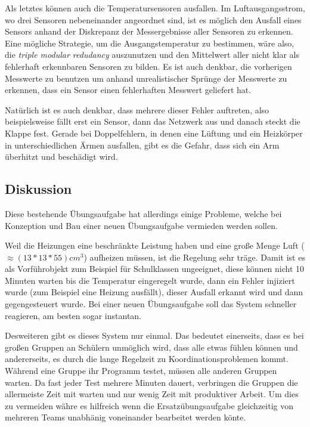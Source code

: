Als letztes k{\"{o}}nnen auch die Temperatursensoren ausfallen. Im Luftausgangsstrom, wo drei Sensoren 
nebeneinander angeordnet sind, ist es m{\"{o}}glich den
Ausfall eines Sensors anhand der Diskrepanz der Messergebnisse aller Sensoren zu erkennen. Eine m{\"{o}}gliche 
Strategie, um die Ausgangstemperatur zu
bestimmen, w{\"{a}}re also, die \textit{triple modular redudancy} auszunutzen und den Mittelwert aller nicht klar als 
fehlerhaft erkennbaren Sensoren zu bilden.
Es ist auch denkbar, die vorherigen Messwerte zu benutzen um anhand unrealistischer Spr{\"{u}}nge der Messwerte zu 
erkennen, dass ein Sensor einen fehlerhaften Messwert geliefert hat.

Nat{\"{u}}rlich ist es auch denkbar, dass mehrere dieser Fehler auftreten, also beispielsweise f{\"{a}}llt
erst ein Sensor, dann das Netzwerk aus und danach steckt die Klappe fest.
Gerade bei Doppelfehlern, in denen eine L{\"{u}}ftung und ein Heizk{\"{o}}rper in unterschiedlichen {\"{A}}rmen 
ausfallen, gibt es die Gefahr, dass sich ein Arm {\"{u}}berhitzt und besch{\"{a}}digt wird.

\subsection{Diskussion}
Diese bestehende {\"{U}}bungsaufgabe hat allerdings einige Probleme, welche bei Konzeption und Bau einer neuen
{\"{U}}bungsaufgabe vermieden werden sollen.

Weil die Heizungen eine beschr{\"{a}}nkte Leistung haben und eine gro{\ss}e Menge Luft 
($ \approx (13*13*55)cm^3$) aufheizen m{\"{u}}ssen, ist die Regelung sehr tr{\"{a}}ge. Damit ist es als
Vorf{\"{u}}hrobjekt zum Beispiel f{\"{u}}r Schulklassen ungeeignet, diese k{\"{o}}nnen nicht 10 Minuten warten
bis die Temperatur eingeregelt wurde, dann ein Fehler injiziert wurde (zum Beispiel eine Heizung
ausf{\"{a}}llt), dieser Ausfall erkannt wird und dann gegengesteuert wurde. Bei einer neuen {\"{U}}bungsaufgabe
soll das System schneller reagieren, am besten sogar instantan.

Desweiteren gibt es dieses System nur einmal. Das bedeutet einerseits, dass es bei gro{\ss}en Gruppen
an Sch{\"{u}}lern unm{\"{o}}glich wird, dass alle etwas f{\"{u}}hlen k{\"{o}}nnen und andererseits, es durch
die lange Regelzeit zu Koordinationsproblemen kommt. W{\"{a}}hrend eine Gruppe ihr Programm testet, m{\"{u}}ssen
alle anderen Gruppen warten. Da fast jeder Test mehrere Minuten dauert, verbringen die Gruppen die
allermeiste Zeit mit warten und nur wenig Zeit mit produktiver Arbeit. Um dies zu vermeiden w{\"{a}}hre es
hilfreich wenn die Ersatz{\"{u}}bungsaufgabe gleichzeitig von mehreren Teams unabh{\"{a}}nig voneinander bearbeitet
werden k{\"{o}}nte.

